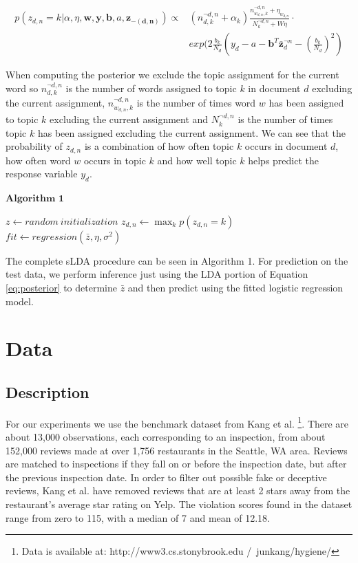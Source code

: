 \documentclass{article}
\begin{document}
\begin{align}
 p(z_{d,n} = k|\alpha,\eta,\textbf{w},\textbf{y},\textbf{b},a,\mathbf{z_{-(d,n)}}) \propto & (n^{\neg d,n}_{d,k} + \alpha_{k})
 \frac{n^{\neg d,n}_{w_{d,n},k} + \eta_{w_{d,n}}}{N^{\neg d,n}_{k} + W\eta}\cdot \nonumber \\
  & exp(2\frac{b_{k}}{N_{d}}(y_{d}-a-\mathbf{b}^{T}\mathbf{\bar{z}}^{\neg n}_{d} - (\frac{b_{k}}{N_{d}})^{2})  \label{eq:posterior}
\end{align}

When computing the posterior we exclude the topic assignment for the current word so $n^{\neg d,n}_{d,k}$ is the number of 
words assigned to topic $k$ in document $d$ excluding the current assignment, $n^{\neg d,n}_{w_{d,n},k}$ is the number of 
times word $w$ has been assigned to topic $k$ excluding the current assignment and $N^{\neg d,n}_{k}$ is the number of times 
topic $k$ has been assigned excluding the current assignment. We can see that the probability of $z_{d,n}$ is a combination of how often topic $k$ occurs in document $d$, how often word $w$ occurs in topic $k$ and how well topic $k$ helps predict the response variable $y_{d}$.

$\textbf{Algorithm 1}$

\begin{algorithmic}[1]
\State $z \gets random\ initialization$
 
   
       
         
          \State $z_{d,n} \gets \max_{k} p(z_{d,n} = k)$ 
        \EndFor
      \EndFor
   \EndFor
   \State $fit \gets regression(\bar{z},\eta,\sigma^{2})$
\EndFor
\end{algorithmic}


The complete sLDA procedure can be seen in Algorithm 1. For prediction on the test data, we perform inference just using the 
LDA portion of Equation \ref{eq:posterior} to determine $\bar{z}$ and then predict using the fitted logistic regression model.

\section{Data}
\subsection{Description}
For our experiments we use the benchmark dataset from Kang et al. \footnote{Data is available at: http://www3.cs.stonybrook.edu
/~junkang/hygiene/}. There are about 13,000 observations, each corresponding to an inspection, from about 152,000 reviews made
at over 1,756 restaurants in the Seattle, WA area. Reviews are matched to inspections if they fall on or before the inspection date, but after the previous inspection date. In order to filter out possible fake or deceptive reviews, Kang et al. have 
removed reviews that are at least 2 stars away from the restaurant's average star rating on Yelp. The violation scores found 
in the dataset range from zero to 115, with a median of 7 and mean of 12.18. 
\end{document}
